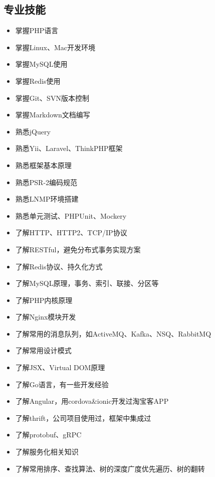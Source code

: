 \documentclass[a4paper,12pt]{article}
\begin{document}
\begin{CJK}{UTF8}{gbsn}
		\section{专业技能}
			\begin{itemize}
				\item{掌握PHP语言}
				\item{掌握Linux、Mac开发环境}
				\item{掌握MySQL使用}
				\item{掌握Redis使用}
				\item{掌握Git、SVN版本控制}
				\item{掌握Markdown文档编写}
				\item{熟悉jQuery}
				\item{熟悉Yii、Laravel、ThinkPHP框架}
				\item{熟悉框架基本原理}
				\item{熟悉PSR-2编码规范}
				\item{熟悉LNMP环境搭建}
				\item{熟悉单元测试、PHPUnit、Mockery}
				\item{了解HTTP、HTTP2、TCP/IP协议}
				\item{了解RESTful，避免分布式事务实现方案}
				\item{了解Redis协议、持久化方式}
				\item{了解MySQL原理，事务、索引、联接、分区等}
				\item{了解PHP内核原理}
				\item{了解Nginx模块开发}
				\item{了解常用的消息队列，如ActiveMQ、Kafka、NSQ、RabbitMQ}
				\item{了解常用设计模式}
				\item{了解JSX、Virtual DOM原理}
				\item{了解Go语言，有一些开发经验}
				\item{了解Angular，用cordova\&ionic开发过淘宝客APP}
				\item{了解thrift，公司项目使用过，框架中集成过}
				\item{了解protobuf、gRPC}
				\item{了解服务化相关知识}
				\item{了解常用排序、查找算法、树的深度广度优先遍历、树的翻转}
			\end{itemize}
		

\end{CJK}
\end{document}
